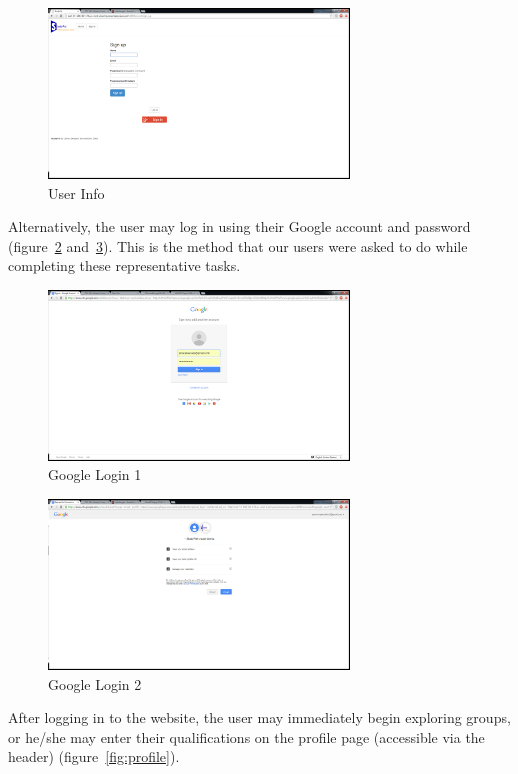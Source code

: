 \documentclass[conference]{IEEEtran}
\begin{document}
\begin{figure}[ht!]
\centering
\includegraphics[width=80mm]{figures/userInfo}
\caption{User Info \label{fig:userInfo}}
\end{figure}

Alternatively, the user may log in using their Google account and password (figure~\ref{fig:oauth1} and~\ref{fig:oauth2}).  This is the method that our users were asked to do while completing these representative tasks.

\begin{figure}[ht!]
\centering
\includegraphics[width=80mm]{figures/oauth1}
\caption{Google Login 1 \label{fig:oauth1}}
\end{figure}

\begin{figure}[ht!]
\centering
\includegraphics[width=80mm]{figures/oauth2}
\caption{Google Login 2 \label{fig:oauth2}}
\end{figure}

After logging in to the website, the user may immediately begin exploring groups, or he/she may enter their qualifications on the profile page (accessible via the header) (figure~\ref{fig:profile}).
\end{document}
